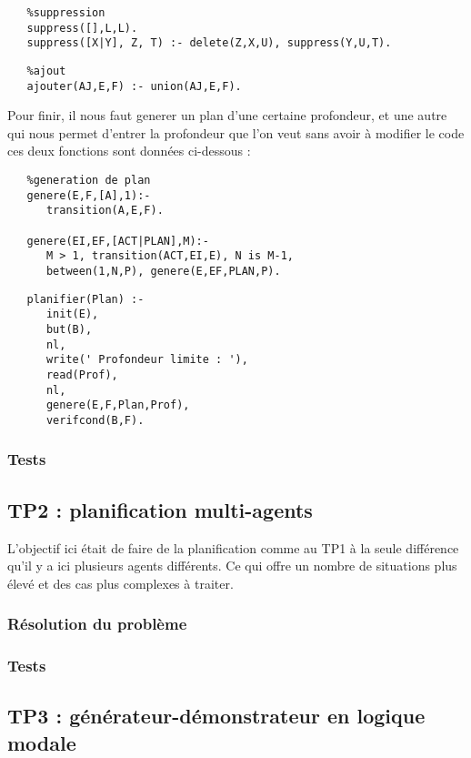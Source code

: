 \documentclass[a4paper,10pt]{article}
\begin{document}
  \begin{lstlisting}
   %suppression
   suppress([],L,L).
   suppress([X|Y], Z, T) :- delete(Z,X,U), suppress(Y,U,T).
  \end{lstlisting}
  \begin{lstlisting}
   %ajout
   ajouter(AJ,E,F) :- union(AJ,E,F).
  \end{lstlisting}
  Pour finir, il nous faut generer un plan d'une certaine profondeur, et une autre qui nous permet d'entrer la profondeur que l'on veut sans avoir
  \`{a} modifier le code ces deux fonctions sont données ci-dessous :
  \begin{lstlisting}
   %generation de plan
   genere(E,F,[A],1):-
      transition(A,E,F).

   genere(EI,EF,[ACT|PLAN],M):-
      M > 1, transition(ACT,EI,E), N is M-1, 
      between(1,N,P), genere(E,EF,PLAN,P).
  \end{lstlisting}
  \begin{lstlisting}
   planifier(Plan) :-
      init(E),
      but(B),
      nl,
      write(' Profondeur limite : '),
      read(Prof),
      nl,
      genere(E,F,Plan,Prof),
      verifcond(B,F).
  \end{lstlisting}
   \subsubsection{Tests}
   
  \subsection{TP2 : planification multi-agents}
 L'objectif ici \'{e}tait de faire de la planification comme au TP1 à la seule différence qu'il y a ici plusieurs agents différents.
 Ce qui offre un nombre de situations plus \'{e}lev\'{e} et des cas plus complexes \`{a} traiter.
 
   \subsubsection{R\'{e}solution du probl\`{e}me}
   \subsubsection{Tests}
   
  \subsection{TP3 : g\'{e}n\'{e}rateur-d\'{e}monstrateur en logique modale}
  
\end{document}
